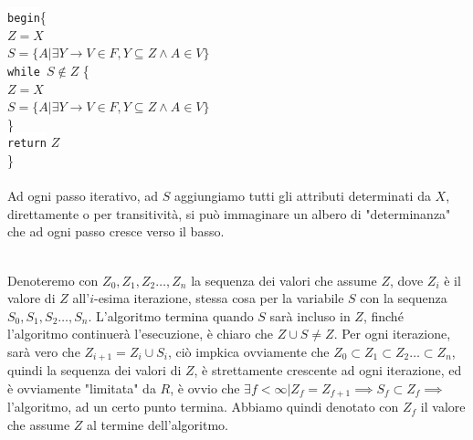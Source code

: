 \documentclass[12pt, letterpaper]{article}
\newcommand{\codee}[1]{\colorbox{white}{\texttt{#1}}}
\newcommand{\acc}{\\\hphantom{}\\}
\begin{document}
\hphantom{ident}\codee{begin}\{\\
\hphantom{ident}\hphantom{ident}\(Z=X\)\\
\hphantom{ident}\hphantom{ident}\(S=\{A|\exists Y\rightarrow V\in F,Y\subseteq Z\land A\in V\}\)\\
\hphantom{ident}\hphantom{ident}\codee{while }\(S\notin Z\) \{\\
\hphantom{ident}\hphantom{ident}\hphantom{ident}\(Z=X\)\\
\hphantom{ident}\hphantom{ident}\hphantom{ident}\(S=\{A|\exists Y\rightarrow V\in F,Y\subseteq Z\land A\in V\}\)\\
\hphantom{ident}\hphantom{ident}\}\\
\hphantom{ident}\codee{return} \(Z\)\\\hphantom{ident}\}\\\hphantom{}\\
Ad ogni passo iterativo, ad \(S\) aggiungiamo tutti gli attributi determinati da \(X\), direttamente 
o per transitività, si può immaginare un albero di "determinanza" che ad ogni passo cresce verso il basso.
\begin{figure}[h]
\end{figure}\\
Denoteremo con \(Z_0,Z_1,Z_2\dots,Z_n\) la sequenza dei valori che assume \(Z\), dove \(Z_i\) è il valore 
di \(Z\) all'\(i\)-esima iterazione, stessa cosa per la variabile \(S\) con la sequenza \(S_0,S_1,S_2\dots,S_n\). L'algoritmo 
termina quando \(S\) sarà incluso in \(Z\), finché l'algoritmo continuerà l'esecuzione, è chiaro che 
\(Z\cup S\ne Z\). Per ogni iterazione, sarà vero che \(Z_{i+1}=Z_i\cup S_i\), ciò impkica ovviamente che 
\(Z_0\subset Z_1\subset Z_2\dots\subset Z_n\), quindi la sequenza dei valori di \(Z\), è strettamente crescente ad ogni iterazione, 
ed è ovviamente "limitata" da \(R\), è ovvio che \(\exists f<\infty|Z_f=Z_{f+1}\implies S_f\subset Z_f\implies \) l'algoritmo, 
ad un certo punto termina. Abbiamo quindi denotato con \(Z_f\) il valore che assume \(Z\) al termine dell'algoritmo.\acc 
\end{document}
